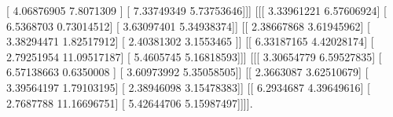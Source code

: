 \documentclass{article}%
\begin{document}
   {[} 4.06876905  7.8071309 {]}\newline%
   {[} 7.33749349  5.73753646{]}{]}{]}\newline%
\newline%
\newline%
 {[}{[}{[} 3.33961221  6.57606924{]}\newline%
   {[} 6.5368703   0.73014512{]}\newline%
   {[} 3.63097401  5.34938374{]}{]}\newline%
\newline%
  {[}{[} 2.38667868  3.61945962{]}\newline%
   {[} 3.38294471  1.82517912{]}\newline%
   {[} 2.40381302  3.1553465 {]}{]}\newline%
\newline%
  {[}{[} 6.33187165  4.42028174{]}\newline%
   {[} 2.79251954 11.09517187{]}\newline%
   {[} 5.4605745   5.16818593{]}{]}{]}\newline%
\newline%
\newline%
 {[}{[}{[} 3.30654779  6.59527835{]}\newline%
   {[} 6.57138663  0.6350008 {]}\newline%
   {[} 3.60973992  5.35058505{]}{]}\newline%
\newline%
  {[}{[} 2.3663087   3.62510679{]}\newline%
   {[} 3.39564197  1.79103195{]}\newline%
   {[} 2.38946098  3.15478383{]}{]}\newline%
\newline%
  {[}{[} 6.2934687   4.39649616{]}\newline%
   {[} 2.7687788  11.16696751{]}\newline%
   {[} 5.42644706  5.15987497{]}{]}{]}{]}.

%
\newpage%
\end{document}

